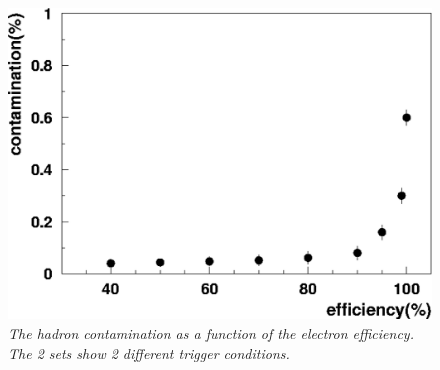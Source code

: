 \begin{figure}[htbp] %
   \centering
   \includegraphics[width=6in]{pid/effic.eps} 
  \caption{\it The hadron contamination as a function of the electron efficiency.
The 2 sets show 2 different trigger conditions.
}
\label{fig:effic}
\end{figure}



  
